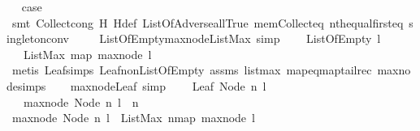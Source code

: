 \begin{isabellebody}
\ \isamarkupfalse%
\ {\isacharquery}case\isanewline
\ \ \ \ \isamarkupfalse%
\ {\isacharparenleft}smt\ Collect{\isacharunderscore}cong\ H{\isacharunderscore}{}\ H{\isacharunderscore}def\ ListOfAdverse{\isacharunderscore}all{\isacharunderscore}True\ mem{\isacharunderscore}Collect{\isacharunderscore}eq\ nth{\isacharunderscore}equal{\isacharunderscore}first{\isacharunderscore}eq\ singleton{\isacharunderscore}conv{\isacharparenright}\ \isanewline
{}\isamarkupfalse%
%
\endisatagproof
{\isafoldproof}%
%
\isadelimproof
\isanewline
%
\endisadelimproof
\ \ \isanewline
{}\isamarkupfalse%
\ ListOfEmpty{\isacharunderscore}max{\isacharunderscore}node{\isacharunderscore}ListMax{\isacharunderscore}{}\ {\isacharbrackleft}simp{\isacharbrackright}{\isacharcolon}\ \isanewline
\ \ \ {\isachardoublequoteopen}ListOfEmpty\ l{\isachardoublequoteclose}\ \isanewline
\ \ \ {\isachardoublequoteopen}ListMax\ {\isacharparenleft}map\ max{\isacharunderscore}node\ l{\isacharparenright}\ {\isacharequal}\ {}{\isachardoublequoteclose}\isanewline
%
\isadelimproof
\ \ %
\endisadelimproof
%
\isatagproof
{}\isamarkupfalse%
\ {\isacharparenleft}metis\ Leaf{\isachardot}simps\ Leaf{\isacharunderscore}non{\isacharunderscore}ListOfEmpty\ assms\ listmax{\isacharunderscore}{}\ map{\isacharunderscore}eq{\isacharunderscore}map{\isacharunderscore}tailrec\ max{\isacharunderscore}node{\isachardot}simps{\isacharparenleft}{}{\isacharparenright}{\isacharparenright}%
\endisatagproof
{\isafoldproof}%
%
\isadelimproof
\isanewline
%
\endisadelimproof
\ \ \isanewline
{}\isamarkupfalse%
\ max{\isacharunderscore}node{\isacharunderscore}Leaf\ {\isacharbrackleft}simp{\isacharbrackright}{\isacharcolon}\ \isanewline
\ \ \ {\isachardoublequoteopen}Leaf\ {\isacharparenleft}Node\ n\ l{\isacharparenright}{\isachardoublequoteclose}\ \isanewline
\ \ \ {\isachardoublequoteopen}max{\isacharunderscore}node\ {\isacharparenleft}Node\ n\ l{\isacharparenright}\ {\isacharequal}\ n{\isachardoublequoteclose}\ \ \ \ \isanewline
%
\isadelimproof
%
\endisadelimproof
%
\isatagproof
{}\isamarkupfalse%
\ {\isacharminus}\isanewline
\ \ \isamarkupfalse%
\ {\isachardoublequoteopen}max{\isacharunderscore}node\ {\isacharparenleft}Node\ n\ l{\isacharparenright}\ {\isacharequal}\ ListMax\ {\isacharparenleft}n{\isacharhash}{\isacharparenleft}map\ max{\isacharunderscore}node\ l{\isacharparenright}{\isacharparenright}{\isachardoublequoteclose}\ \isamarkupfalse%

\end{isabellebody}

